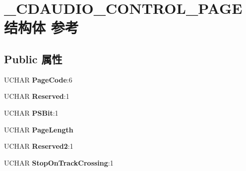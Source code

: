 \hypertarget{struct___c_d_a_u_d_i_o___c_o_n_t_r_o_l___p_a_g_e}{}\section{\+\_\+\+C\+D\+A\+U\+D\+I\+O\+\_\+\+C\+O\+N\+T\+R\+O\+L\+\_\+\+P\+A\+G\+E结构体 参考}
\label{struct___c_d_a_u_d_i_o___c_o_n_t_r_o_l___p_a_g_e}
\subsection*{Public 属性}
\begin{DoxyCompactItemize}
\item 
\mbox{\label{struct___c_d_a_u_d_i_o___c_o_n_t_r_o_l___p_a_g_e_af67a0d96d476b6703704103ec6617e9a}} 
U\+C\+H\+AR {\bfseries Page\+Code}\+:6
\item 
\mbox{\label{struct___c_d_a_u_d_i_o___c_o_n_t_r_o_l___p_a_g_e_a396828de893784a9f9d02837ace05658}} 
U\+C\+H\+AR {\bfseries Reserved}\+:1
\item 
\mbox{\label{struct___c_d_a_u_d_i_o___c_o_n_t_r_o_l___p_a_g_e_ad951aa634619e5e697e7c3dba8072aff}} 
U\+C\+H\+AR {\bfseries P\+S\+Bit}\+:1
\item 
\mbox{\label{struct___c_d_a_u_d_i_o___c_o_n_t_r_o_l___p_a_g_e_a39516f7e1386f5112badadbf54f22877}} 
U\+C\+H\+AR {\bfseries Page\+Length}
\item 
\mbox{\label{struct___c_d_a_u_d_i_o___c_o_n_t_r_o_l___p_a_g_e_ac61a517235bd730683b4f8756c51aeb6}} 
U\+C\+H\+AR {\bfseries Reserved2}\+:1
\item 
\mbox{\label{struct___c_d_a_u_d_i_o___c_o_n_t_r_o_l___p_a_g_e_a1bbf70aa9ed9bcd18d91c58fac8c2d05}} 
U\+C\+H\+AR {\bfseries Stop\+On\+Track\+Crossing}\+:1
\item 
\mbox{\label{struct___c_d_a_u_d_i_o___c_o_n_t_r_o_l___p_a_g_e_aeef3cbb94ca5e132fc8559f74e0de3bb}} 

\end{DoxyCompactItemize}
